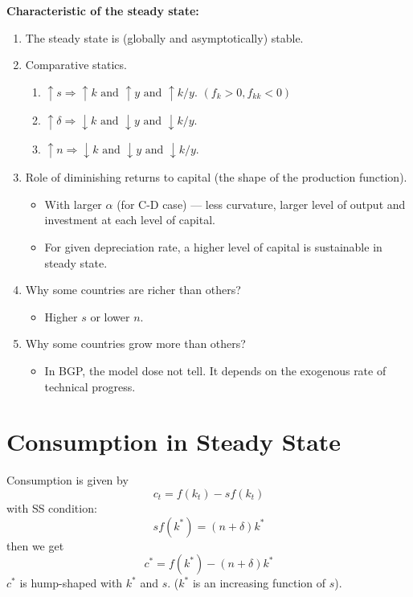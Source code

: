 \textbf{Characteristic of the steady state:} \begin{enumerate}
    \item The steady state is (globally and asymptotically) stable.
    \item Comparative statics. \begin{enumerate}
              \item $\uparrow s \Rightarrow \uparrow k \text{ and } \uparrow y \text{ and } \uparrow k/y$. $(f_k > 0, f_{kk} < 0)$
              \item $\uparrow \delta \Rightarrow \downarrow k \text{ and } \downarrow y \text{ and } \downarrow k/y$.
              \item $\uparrow n \Rightarrow \downarrow k \text{ and } \downarrow y \text{ and } \downarrow k/y$.
          \end{enumerate}
    \item Role of diminishing returns to capital (the shape of the production function). \begin{itemize}
              \item With larger $\alpha$ (for C-D case) --- less curvature, larger level of output and investment at each level of capital.
              \item For given depreciation rate, a higher level of capital is sustainable in steady state.
          \end{itemize}
    \item Why some countries are richer than others? \begin{itemize}
              \item Higher $s$ or lower $n$.
          \end{itemize}
    \item Why some countries grow more than others? \begin{itemize}
              \item In BGP, the model dose not tell. It depends on the exogenous rate of technical progress.
          \end{itemize}
\end{enumerate}

\section{Consumption in Steady State} Consumption is given by
\[
    c_t  = f(k_t) - s f(k_t)
\]with SS condition: \[
    sf(k^*)    =(n+\delta)k^*
\] then we get \[
    c^* = f(k^*) - (n+\delta)k^*
\]
$c^*$ is hump-shaped with $k^*$ and $s$. ($k^*$ is an increasing function of $s$).

